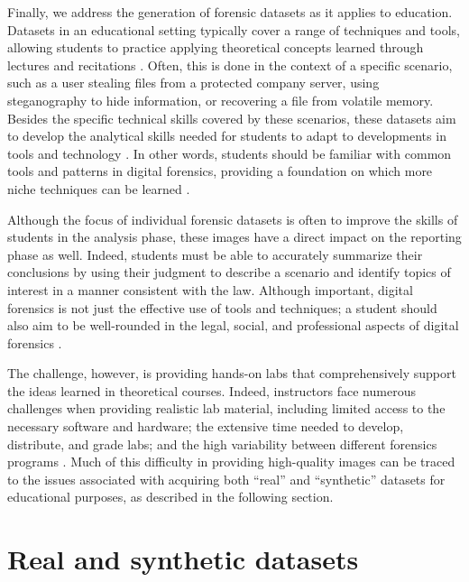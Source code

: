 \documentclass[letterpaper,12pt]{report}
\begin{document}
Finally, we address the generation of forensic datasets as it applies to
education. Datasets in an educational setting typically cover a range of
techniques and tools, allowing students to practice applying theoretical
concepts learned through lectures and recitations
\cite{adelsteinAutomaticallyCreatingRealistic2005}. Often, this is
done in the context of a specific scenario, such as a user stealing
files from a protected company server, using steganography to hide
information, or recovering a file from volatile memory. Besides the
specific technical skills covered by these scenarios, these datasets aim
to develop the analytical skills needed for students to adapt to
developments in tools and technology
\cite{cooperStandardsDigitalForensics2010}. In other words, students
should be familiar with common tools and patterns in digital forensics,
providing a foundation on which more niche techniques can be learned
\cite{lawrenceFrameworkDesignWebbased2009}.

Although the focus of individual forensic datasets is often to improve
the skills of students in the analysis phase, these images have a direct
impact on the reporting phase as well. Indeed, students must be able to
accurately summarize their conclusions by using their judgment to
describe a scenario and identify topics of interest in a manner
consistent with the law. Although important, digital forensics is not
just the effective use of tools and techniques; a student should also
aim to be well-rounded in the legal, social, and professional aspects of
digital forensics \cite{andersonComparativeStudyTeaching2006}.

The challenge, however, is providing hands-on labs that comprehensively
support the ideas learned in theoretical courses. Indeed, instructors
face numerous challenges when providing realistic lab material,
including limited access to the necessary software and hardware; the
extensive time needed to develop, distribute, and grade labs; and the
high variability between different forensics programs
\cite{adelsteinAutomaticallyCreatingRealistic2005,guptaDigitalForensicsLab2022,lawrenceFrameworkDesignWebbased2009}.
Much of this difficulty in providing high-quality images can be traced
to the issues associated with acquiring both ``real'' and ``synthetic''
datasets for educational purposes, as described in the following
section.

\section{Real and synthetic
datasets}\label{real-and-synthetic-datasets}
\end{document}
